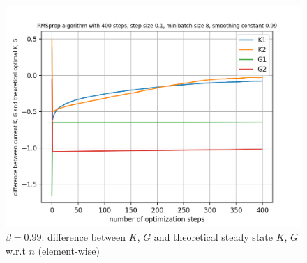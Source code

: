 \documentclass{article}
\begin{document}
\begin{figure}[h!]
\begin{minipage}[t]{.28\paperwidth}
		\centering
		\includegraphics[width=1.0\textwidth]{Figures/d_beta_0_99_sep.png}
		\caption{$\beta = 0.99$: difference between $K$, $G$ and theoretical steady state $K$, $G$ w.r.t $n$ (element-wise)}
	\end{minipage}
\end{figure}
\end{document}
